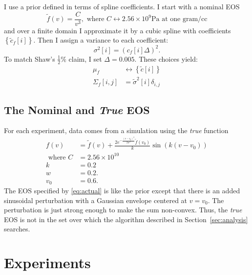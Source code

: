 \documentclass[11pt]{article}
\newcommand{\fnom}{\tilde f}
\newcommand\vol{v}        %
\newcommand{\eos}{f}
\newcommand{\eosnom}{\tilde f}
\newcommand\cf{c_f}
\begin{document}
I use a prior defined in terms of spline coefficients.  I start with a
nominal EOS
\begin{equation}
  \label{eq:2}
  \eosnom(\vol) = \frac{C}{\vol^3}, \text{ where } C \leftrightarrow
  2.56\times10^9 \text{Pa} \text{ at one gram/cc}
\end{equation}
and over a finite domain I approximate it by a cubic spline with
coefficients $\left\{\tilde \cf[i] \right\}$.  Then I assign a variance to
  each coefficient:
\begin{equation}
  \label{eq:3}
  \sigma^2[i] = \left( \cf[i] \Delta \right)^2.
\end{equation}
To match Shaw's $\frac{1}{2} \%$ claim, I set $\Delta = 0.005$.  These
choices yield:
\begin{align*}
  \mu_\eos &\leftrightarrow \left\{\tilde c[i] \right\} \\
  \Sigma_\eos[i,j] &= \tilde \sigma^2[i] \delta_{i,j}
\end{align*}

\subsection{The Nominal and \emph{True} EOS}
\label{sec:true-eos}


\newcommand{\freq}{k} %
For each experiment, data comes from a simulation using the
\emph{true} function
\begin{align}
  \label{eq:actual}
  f(v) &= \fnom(v) + \frac{2 e^{-\frac{(v-v_0)^2}{2w^2}}
         \fnom(v_0)}{\freq}  \sin(\freq (v-v_0))\\
   \text{ where }C &= 2.56\times 10^{10} \nonumber \\
  \freq &= 0.2 \nonumber \\
  w &= 0.2. \nonumber \\
  v_0 &= 0.6. \nonumber
\end{align}
The EOS specified by \eqref{eq:actual} is like the prior except that
there is an added sinusoidal perturbation with a Gaussian envelope
centered at $v=v_0$.  The perturbation is just strong enough to make
the sum non-convex.  Thus, the \emph{true} EOS is not in the set over
which the algorithm described in Section~\ref{sec:analysis} searches.

\section{Experiments}
\label{sec:experiments}
\end{document}
